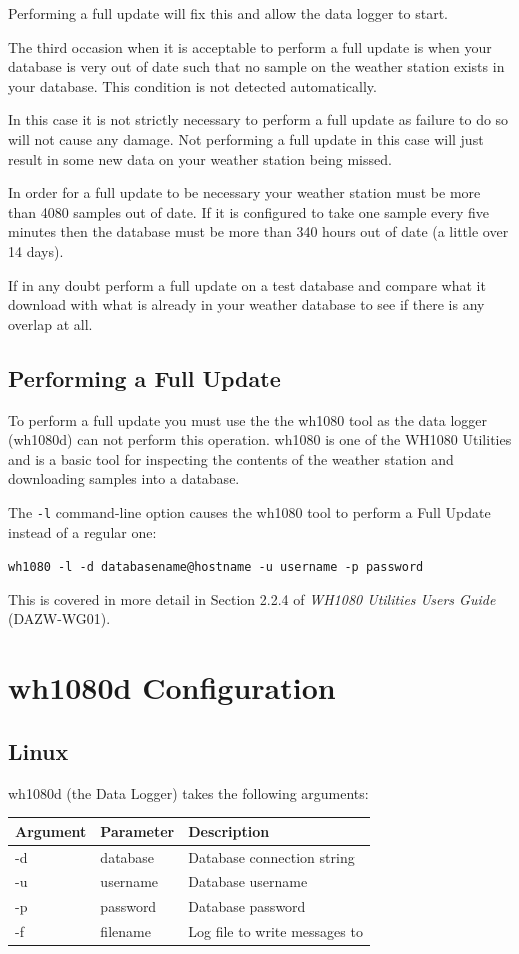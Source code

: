 \documentclass[a4paper,10pt,draft]{book}
\begin{document}
Performing a full update will fix this and allow the data logger to start.

The third occasion when it is acceptable to perform a full update is when your database is very out of date such that no sample on the weather station exists in your database. This condition is not detected automatically.

In this case it is not strictly necessary to perform a full update as failure to do so will not cause any damage. Not performing a full update in this case will just result in some new data on your weather station being missed.

In order for a full update to be necessary your weather station must be more than 4080 samples out of date. If it is configured to take one sample every five minutes then the database must be more than 340 hours out of date (a little over 14 days).

If in any doubt perform a full update on a test database and compare what it download with what is already in your weather database to see if there is any overlap at all.

\subsection{Performing a Full Update}
To perform a full update you must use the the wh1080 tool as the data logger (wh1080d) can not perform this operation. wh1080 is one of the WH1080 Utilities and is a basic tool for inspecting the contents of the weather station and downloading samples into a database.

The \verb|-l| command-line option causes the wh1080 tool to perform a Full Update instead of a regular one:

\verb|wh1080 -l -d databasename@hostname -u username -p password|

This is covered in more detail in Section 2.2.4 of \emph{WH1080 Utilities Users Guide} (DAZW-WG01).

\section{wh1080d Configuration}
\subsection{Linux}

wh1080d (the Data Logger) takes the following arguments:

\begin{tabular}{l l p{10cm}}
\hline
\textbf{Argument} & \textbf{Parameter} & \textbf{Description} \\
\hline
-d & database & Database connection string \\
-u & username & Database username \\
-p & password & Database password \\
-f & filename & Log file to write messages to \\
\hline
\end{tabular}
\end{document}
